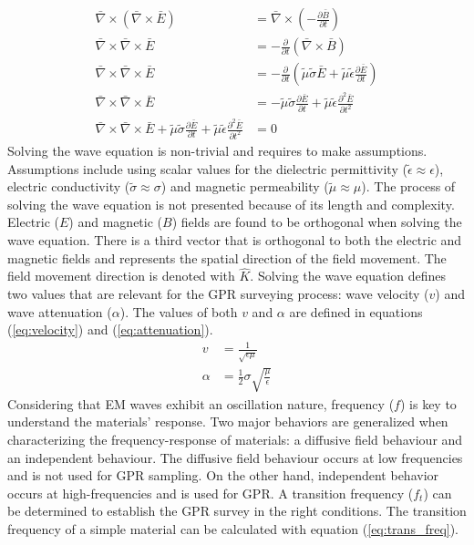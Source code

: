 \documentclass{article}
\begin{document}
\begin{align}
    \bar{\nabla} \times (\bar{\nabla} \times \bar{E}) &= \bar{\nabla} \times \left( - \frac{\partial \bar{B}}{\partial t} \right) \nonumber \\
    \bar{\nabla} \times \bar{\nabla} \times \bar{E} &= - \frac{\partial}{\partial t} (\bar{\nabla} \times \bar{B}) \nonumber \\
    \bar{\nabla} \times \bar{\nabla} \times \bar{E} &= - \frac{\partial}{\partial t} (\tilde{\mu} \tilde{\sigma} \bar{E} + \tilde{\mu} \tilde{\epsilon} \frac{\partial \bar{E}}{\partial t}) \nonumber \\
    \bar{\nabla} \times \bar{\nabla} \times \bar{E} &= - \tilde{\mu} \tilde{\sigma} \frac{\partial \bar{E}}{\partial t} + \tilde{\mu} \tilde{\epsilon} \frac{\partial^{2} \bar{E}}{\partial t^{2}} \nonumber \\
     \bar{\nabla} \times \bar{\nabla} \times \bar{E} + \tilde{\mu} \tilde{\sigma} \frac{\partial \bar{E}}{\partial t} + \tilde{\mu} \tilde{\epsilon} \frac{\partial^{2} \bar{E}}{\partial t^{2}} &= 0 \label{eq:wave_eq}
\end{align}
Solving the wave equation is non-trivial and requires to make assumptions. Assumptions include using scalar values for the dielectric permittivity ($\tilde{\epsilon} \approx \epsilon$), electric conductivity ($\tilde{\sigma} \approx \sigma$) and magnetic permeability ($\tilde{\mu} \approx \mu$). The process of solving the wave equation is not presented because of its length and complexity. Electric ($E$) and magnetic ($B$) fields are found to be orthogonal when solving the wave equation. There is a third vector that is orthogonal to both the electric and magnetic fields and represents the spatial direction of the field movement. The field movement direction is denoted with $\hat{K}$. Solving the wave equation defines two values that are relevant for the GPR surveying process: wave velocity ($v$) and wave attenuation ($\alpha$). The values of both $v$ and $\alpha$ are defined in equations (\ref{eq:velocity}) and (\ref{eq:attenuation}).
\begin{align}
    v &= \frac{1}{\sqrt{\epsilon \mu}} \label{eq:velocity} \\
    \alpha &= \frac{1}{2} \sigma \sqrt{\frac{\mu}{\epsilon}} \label{eq:attenuation}
\end{align}
Considering that EM waves exhibit an oscillation nature, frequency ($f$) is key to understand the materials' response. Two major behaviors are generalized when characterizing the frequency-response of materials: a diffusive field behaviour and an independent behaviour. The diffusive field behaviour occurs at low frequencies and is not used for GPR sampling. On the other hand, independent behavior occurs at high-frequencies and is used for GPR. A transition frequency ($f_{t}$) can be determined to establish the GPR survey in the right conditions. The transition frequency of a simple material can be calculated with equation (\ref{eq:trans_freq}).
\end{document}
